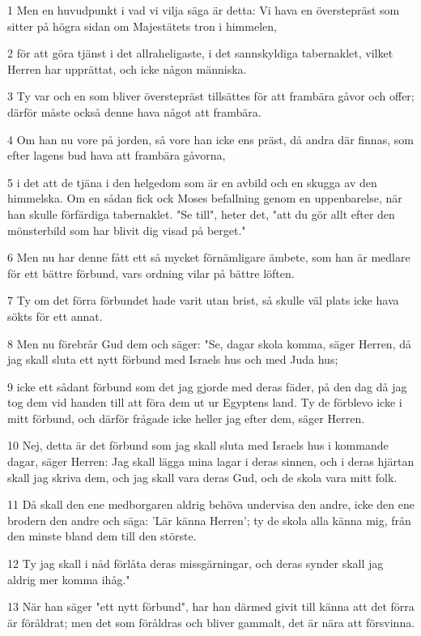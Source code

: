\par 1 Men en huvudpunkt i vad vi vilja säga är detta: Vi hava en överstepräst som sitter på högra sidan om Majestätets tron i himmelen,
\par 2 för att göra tjänst i det allraheligaste, i det sannskyldiga tabernaklet, vilket Herren har upprättat, och icke någon människa.
\par 3 Ty var och en som bliver överstepräst tillsättes för att frambära gåvor och offer; därför måste också denne hava något att frambära.
\par 4 Om han nu vore på jorden, så vore han icke ens präst, då andra där finnas, som efter lagens bud hava att frambära gåvorna,
\par 5 i det att de tjäna i den helgedom som är en avbild och en skugga av den himmelska. Om en sådan fick ock Moses befallning genom en uppenbarelse, när han skulle förfärdiga tabernaklet. "Se till", heter det, "att du gör allt efter den mönsterbild som har blivit dig visad på berget."
\par 6 Men nu har denne fått ett så mycket förnämligare ämbete, som han är medlare för ett bättre förbund, vars ordning vilar på bättre löften.
\par 7 Ty om det förra förbundet hade varit utan brist, så skulle väl plats icke hava sökts för ett annat.
\par 8 Men nu förebrår Gud dem och säger: "Se, dagar skola komma, säger Herren, då jag skall sluta ett nytt förbund med Israels hus och med Juda hus;
\par 9 icke ett sådant förbund som det jag gjorde med deras fäder, på den dag då jag tog dem vid handen till att föra dem ut ur Egyptens land. Ty de förblevo icke i mitt förbund, och därför frågade icke heller jag efter dem, säger Herren.
\par 10 Nej, detta är det förbund som jag skall sluta med Israels hus i kommande dagar, säger Herren: Jag skall lägga mina lagar i deras sinnen, och i deras hjärtan skall jag skriva dem, och jag skall vara deras Gud, och de skola vara mitt folk.
\par 11 Då skall den ene medborgaren aldrig behöva undervisa den andre, icke den ene brodern den andre och säga: 'Lär känna Herren'; ty de skola alla känna mig, från den minste bland dem till den störste.
\par 12 Ty jag skall i nåd förlåta deras missgärningar, och deras synder skall jag aldrig mer komma ihåg."
\par 13 När han säger "ett nytt förbund", har han därmed givit till känna att det förra är föråldrat; men det som föråldras och bliver gammalt, det är nära att försvinna.

